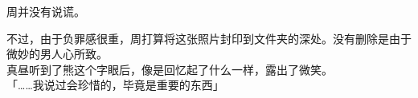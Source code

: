 周并没有说谎。

不过，由于负罪感很重，周打算将这张照片封印到文件夹的深处。没有删除是由于微妙的男人心所致。\\

真昼听到了熊这个字眼后，像是回忆起了什么一样，露出了微笑。\\

「……我说过会珍惜的，毕竟是重要的东西」\\














